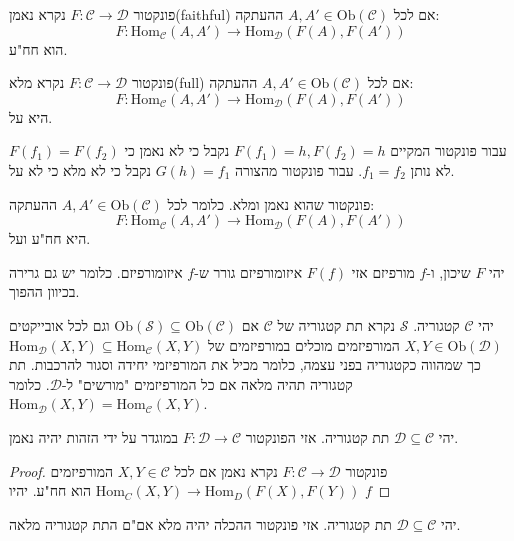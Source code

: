 \documentclass{tstextbook}
\begin{document}
פונקטור \(F:\mathcal{C}\to \mathcal{D}\) נקרא נאמן(faithful) אם לכל \(A,A' \in \mathrm{Ob}(\mathcal{C})\) ההעתקה:
$$F:\mathrm{Hom}_{\mathcal{C}}(A,A')\to \mathrm{Hom}_{\mathcal{D} }(F(A),F(A'))$$
הוא חח"ע.

\begin{definition}
פונקטור \(F:\mathcal{C}\to \mathcal{D}\) נקרא מלא(full) אם לכל \(A,A' \in \mathrm{Ob}(\mathcal{C})\) ההעתקה:
$$F:\mathrm{Hom}_{\mathcal{C}}(A,A')\to \mathrm{Hom}_{\mathcal{D} }(F(A),F(A'))$$
היא על.

\end{definition}
\begin{example}
\end{example}
עבור פונקטור המקיים \(F(f_{1})=h,F(f_{2})=h\) נקבל כי לא נאמן כי \(F(f_{1})=F(f_{2})\) לא נותן \(f_{1}=f_{2}\). עבור פונקטור מהצורה \(G(h)=f_{1}\) נקבל כי לא מלא כי לא על.

\begin{definition}[שיכון]
פונקטור שהוא נאמן ומלא. כלומר לכל \(A,A' \in \mathrm{Ob}(\mathcal{C})\) ההעתקה:
$$F:\mathrm{Hom}_{\mathcal{C}}(A,A')\to \mathrm{Hom}_{\mathcal{D} }(F(A),F(A'))$$
היא חח"ע ועל.

\end{definition}
\begin{proposition}
יהי \(F\) שיכון, ו-\(f\) מורפיזם אזי \(F(f)\) איזומורפיזם גורר ש-\(f\) איזומורפיזם. כלומר יש גם גרירה בכיוון ההפוך.

\end{proposition}
\begin{reminder}[תת קטגוריה]
יהי \(\mathcal{C}\) קטגוריה. \(\mathcal{S}\) נקרא תת קטגוריה של \(\mathcal{C}\) אם \(\mathrm{Ob}(\mathcal{S})\subseteq \mathrm{Ob}(\mathcal{C})\) וגם לכל אובייקטים \(X,Y \in \mathrm{Ob}(\mathcal{D})\) המורפיזמים מוכלים במורפיזמים של \(\mathrm{Hom}_{\mathcal{D}}(X,Y)\subseteq \mathrm{Hom}_{\mathcal{C}}(X,Y)\) כך שמהווה כקטגוריה בפני עצמה, כלומר מכיל את המורפיזמי יחידה וסגור להרכבות. תת קטגוריה תהיה מלאה אם כל המורפיזמים "מורשים" ל-\(\mathcal{D}\). כלומר \(\mathrm{Hom}_{\mathcal{D}}(X,Y)= \mathrm{Hom}_{\mathcal{C}}(X,Y)\).

\end{reminder}
\begin{proposition}
יהי \(\mathcal{D}\subseteq \mathcal{C}\) תת קטגוריה. אזי הפונקטור \(F:\mathcal{D}\to \mathcal{C}\) במוגדר על ידי הזהות יהיה נאמן.

\end{proposition}
\begin{proof}
פונקטור \(F:\mathcal{C}\to \mathcal{D}\) נקרא נאמן אם לכל \(X,Y \in \mathcal{C}\) המורפיזמים \(\mathrm{Hom}_C(X, Y) \to \mathrm{Hom}_D(F(X), F(Y))\) הוא חח"ע. 
יהיו \(f\)

\end{proof}
\begin{proposition}
יהי \(\mathcal{D}\subseteq \mathcal{C}\) תת קטגוריה. אזי פונקטור ההכלה יהיה מלא אם"ם התת קטגוריה מלאה.

\end{proposition}
\end{document}
